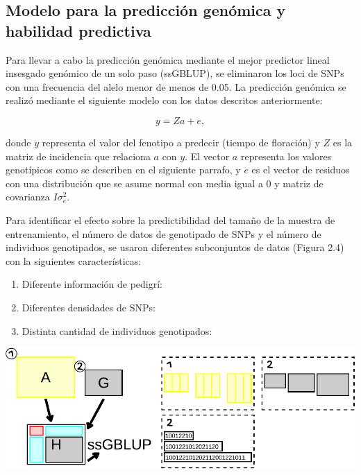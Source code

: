\documentclass[11pt,spanish,a4paper,oneside,]{book} %
\begin{document}
\hypertarget{modelo-para-la-predicciuxf3n-genuxf3mica-y-habilidad-predictiva}{%
\subsection{Modelo para la predicción genómica y habilidad predictiva}\label{modelo-para-la-predicciuxf3n-genuxf3mica-y-habilidad-predictiva}}

Para llevar a cabo la predicción genómica mediante el mejor predictor lineal insesgado genómico de un solo paso (ssGBLUP), se eliminaron los loci de SNPs con una frecuencia del alelo menor de menos de 0.05. La predicción genómica se realizó mediante el siguiente modelo con los datos descritos anteriormente:

\begin{equation}
y = Za + e,
\end{equation}

donde \(y\) representa el valor del fenotipo a predecir (tiempo de floración) y \(Z\) es la matriz de incidencia que relaciona \(a\) con \(y\). El vector \(a\) representa los valores genotípicos como se describen en el siguiente parrafo, y \(e\) es el vector de residuos con una distribución que se asume normal con media igual a \(0\) y matriz de covarianza \(I\sigma^{2}_{e}\).

Para identificar el efecto sobre la predictibilidad del tamaño de la muestra de entrenamiento, el número de datos de genotipado de SNPs y el número de individuos genotipados, se usaron diferentes subconjuntos de datos (Figura 2.4) con la siguientes características:

\begin{enumerate}
\def\labelenumi{\arabic{enumi}.}
\item
  Diferente información de pedigrí:
\item
  Diferentes densidades de SNPs:
\item
  Distinta cantidad de individuos genotipados:
\end{enumerate}

\begin{center}\includegraphics[width=1\linewidth]{figures/Esquema_1} \end{center}
\end{document}
